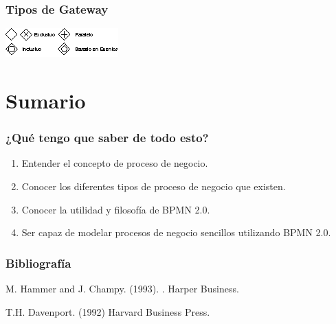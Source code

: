 \documentclass[handout,a4paper,slidestop,xcolor=pst,blue]{beamer}
\begin{document}
\begin{frame}[c]
    \frametitle{Tipos de Gateway}
    \begin{center}
        \includegraphics[width=0.75\linewidth]{images/symbols/gatewayKinds.eps}
    \end{center}
\end{frame}

\section{Sumario}

\begin{frame}[c]
    \frametitle{¿Qué tengo que saber de todo esto?}
    \begin{enumerate}[<+->]
        \item Entender el concepto de proceso de negocio.
        \item Conocer los diferentes tipos de proceso de negocio que existen.
        \item Conocer la utilidad y filosofía de BPMN 2.0.
        \item Ser capaz de modelar procesos de negocio sencillos utilizando BPMN 2.0.
    \end{enumerate}
\end{frame}

\begin{frame}[c]
    \frametitle{Bibliografía}
    \begin{thebibliography}{1}
        M. Hammer and J. Champy. (1993).
        .
        \newblock Harper Business.

        T.H. Davenport. (1992) 
        \newblock Harvard Business Press.
    \end{thebibliography}
\end{frame}
\end{document}
